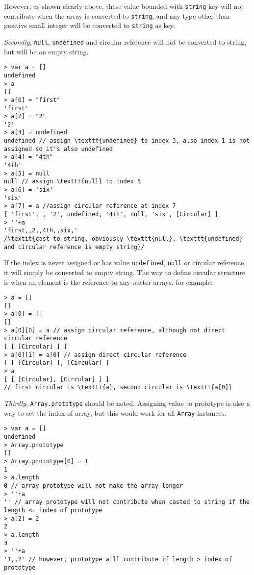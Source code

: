 However, as shown clearly above, these value bounded with \texttt{string} key will not contribute when the array is converted to \texttt{string}, and any type other than positive small integer will be converted to \texttt{string} as key.

\textit{Secondly}, \texttt{null}, \texttt{undefined} and circular reference will not be converted to string, but will be an empty string.

\begin{verbatim}
> var a = []
undefined
> a
[]
> a[0] = "first"
'first'
> a[2] = "2"
'2'
> a[3] = undefined
undefined // assign \texttt{undefined} to index 3, also index 1 is not assigned so it's also undefined
> a[4] = "4th"
'4th'
> a[5] = null
null // assign \texttt{null} to index 5
> a[6] = 'six'
'six'
> a[7] = a //assign circular reference at index 7
[ 'first', , '2', undefined, '4th', null, 'six', [Circular] ]
> ''+a
'first,,2,,4th,,six,'
/\textit{cast to string, obviously \texttt{null}, \texttt{undefined} and circular reference is empty string}/
\end{verbatim}

If the index is never assigned or has value \texttt{undefined}, \texttt{null} or circular reference, it will simply be converted to empty string. The way to define circular structure is when an element is the reference to any outter arrays, for example:

\begin{verbatim}
> a = []
[]
> a[0] = []
[]
> a[0][0] = a // assign circular reference, although not direct circular reference
[ [ [Circular] ] ]
> a[0][1] = a[0] // assign direct circular reference
[ [ [Circular] ], [Circular] ]
> a
[ [ [Circular], [Circular] ] ]
// first circular is \texttt{a}, second circular is \texttt{a[0]}
\end{verbatim}

\textit{Thirdly}, \texttt{Array.prototype} should be noted. Assigning value to prototype is also a way to set the index of array, but this would work for all \texttt{Array} instances.

\begin{verbatim}
> var a = []
undefined
> Array.prototype
[]
> Array.prototype[0] = 1
1
> a.length
0 // array prototype will not make the array longer
> ''+a
'' // array prototype will not contribute when casted to string if the length <= index of prototype
> a[2] = 2
2
> a.length
3
> ''+a
'1,,2' // however, prototype will contribute if length > index of prototype
\end{verbatim}

